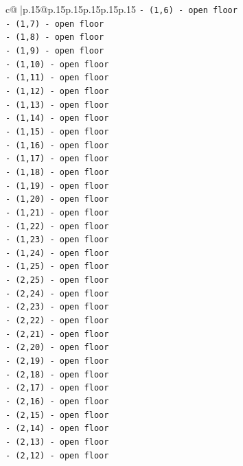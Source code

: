 \documentclass{article}
\begin{document}
{\begin{supertabular}{c@{$\;$}|p{.15\linewidth}@{}p{.15\linewidth}p{.15\linewidth}p{.15\linewidth}p{.15\linewidth}p{.15\linewidth}}
{{{\texttt{{-} (1,6) {-} open floor} \\
\texttt{{-} (1,7) {-} open floor} \\
\texttt{{-} (1,8) {-} open floor} \\
\texttt{{-} (1,9) {-} open floor} \\
\texttt{{-} (1,10) {-} open floor} \\
\texttt{{-} (1,11) {-} open floor} \\
\texttt{{-} (1,12) {-} open floor} \\
\texttt{{-} (1,13) {-} open floor} \\
\texttt{{-} (1,14) {-} open floor} \\
\texttt{{-} (1,15) {-} open floor} \\
\texttt{{-} (1,16) {-} open floor} \\
\texttt{{-} (1,17) {-} open floor} \\
\texttt{{-} (1,18) {-} open floor} \\
\texttt{{-} (1,19) {-} open floor} \\
\texttt{{-} (1,20) {-} open floor} \\
\texttt{{-} (1,21) {-} open floor} \\
\texttt{{-} (1,22) {-} open floor} \\
\texttt{{-} (1,23) {-} open floor} \\
\texttt{{-} (1,24) {-} open floor} \\
\texttt{{-} (1,25) {-} open floor} \\
\texttt{{-} (2,25) {-} open floor} \\
\texttt{{-} (2,24) {-} open floor} \\
\texttt{{-} (2,23) {-} open floor} \\
\texttt{{-} (2,22) {-} open floor} \\
\texttt{{-} (2,21) {-} open floor} \\
\texttt{{-} (2,20) {-} open floor} \\
\texttt{{-} (2,19) {-} open floor} \\
\texttt{{-} (2,18) {-} open floor} \\
\texttt{{-} (2,17) {-} open floor} \\
\texttt{{-} (2,16) {-} open floor} \\
\texttt{{-} (2,15) {-} open floor} \\
\texttt{{-} (2,14) {-} open floor} \\
\texttt{{-} (2,13) {-} open floor} \\
\texttt{{-} (2,12) {-} open floor} \\
}}}
\end{supertabular}}
\end{document}
